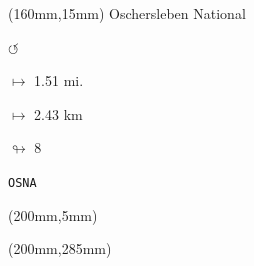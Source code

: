 \begin{textblock*}{40mm}(160mm,15mm)%
Oschersleben National
\par \Huge$\circlearrowleft$
\Large
\par$\mapsto$ 1.51 mi.
\par$\mapsto$ 2.43 km
\par$\looparrowright$ 8
\par\hfill\tiny\tt OSNA\\
\end{textblock*}
\begin{textblock*}{20mm}(200mm,5mm)%
\fbox{\thepage}
\end{textblock*}
\begin{textblock*}{20mm}(200mm,285mm)%
\fbox{\thepage}
\end{textblock*}
\null\newpage

